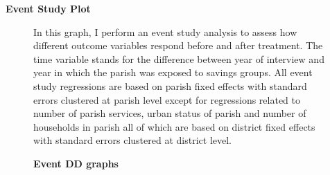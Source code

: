 \documentclass[12pt]{article}
\begin{document}
{\clearpage
\textbf{Event Study Plot}
\graphicspath{{Images/}}
\begin{figure}[ht]
\caption{\textbf{Event DD graphs}}
\label{fig:fig3}
\footnotesize{In this graph, I perform an event study analysis to assess how different outcome variables respond before and after treatment. The time variable stands for the difference between year of interview and year in which the parish was exposed to savings groups. All event study regressions are based on parish fixed effects with standard errors clustered at parish level except for regressions related to number of parish services, urban status of parish and number of households in parish all of which are based on district fixed effects with standard errors clustered at district level.}
\end{figure}


}
\end{document}
